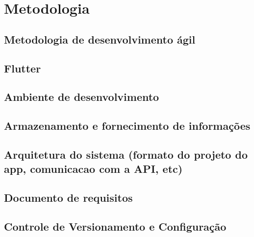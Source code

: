 \chapter{Metodologia}

\section{Metodologia de desenvolvimento ágil}
\lipsum[1]

\section{Flutter}
\lipsum[1]

\section{Ambiente de desenvolvimento}
\lipsum[1]

\section{Armazenamento e fornecimento de informações}
\lipsum[1]

\section{Arquitetura do sistema (formato do projeto do app, comunicacao com a API, etc)}
\lipsum[1]

\section{Documento de requisitos}
\lipsum[1]

\section{Controle de Versionamento e Configuração}
\lipsum[1]

